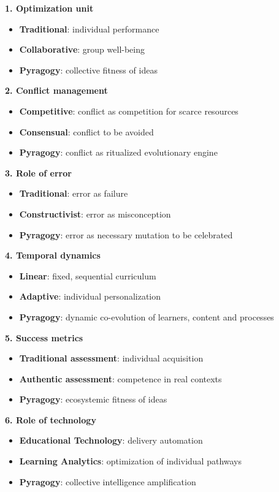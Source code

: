 \textbf{1. Optimization unit}
\begin{itemize}
	\item \textbf{Traditional}: individual performance
	\item \textbf{Collaborative}: group well-being
	\item \textbf{Pyragogy}: collective fitness of ideas
\end{itemize}

\textbf{2. Conflict management}
\begin{itemize}
	\item \textbf{Competitive}: conflict as competition for scarce resources
	\item \textbf{Consensual}: conflict to be avoided
	\item \textbf{Pyragogy}: conflict as ritualized evolutionary engine
\end{itemize}

\textbf{3. Role of error}
\begin{itemize}
	\item \textbf{Traditional}: error as failure
	\item \textbf{Constructivist}: error as misconception
	\item \textbf{Pyragogy}: error as necessary mutation to be celebrated
\end{itemize}

\textbf{4. Temporal dynamics}
\begin{itemize}
	\item \textbf{Linear}: fixed, sequential curriculum
	\item \textbf{Adaptive}: individual personalization
	\item \textbf{Pyragogy}: dynamic co-evolution of learners, content and processes
\end{itemize}

\textbf{5. Success metrics}
\begin{itemize}
	\item \textbf{Traditional assessment}: individual acquisition
	\item \textbf{Authentic assessment}: competence in real contexts
	\item \textbf{Pyragogy}: ecosystemic fitness of ideas
\end{itemize}
\newpage
\textbf{6. Role of technology}
\begin{itemize}
	\item \textbf{Educational Technology}: delivery automation
	\item \textbf{Learning Analytics}: optimization of individual pathways
	\item \textbf{Pyragogy}: collective intelligence amplification
\end{itemize}

